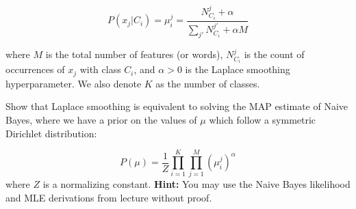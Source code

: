 \documentclass[lang=cn,11pt]{elegantbook}
\begin{document}
\begin{equation}
    P(x_j | C_i) = \mu_i^j = \frac{N_{C_i}^j + \alpha}{\sum_{j'} N_{C_i}^{j'} + \alpha M}
\end{equation}

where $M$ is the total number of features (or words), $N_{C_i}^j$ is the count of occurrences of $x_j$ with class $C_i$, and $\alpha > 0$ is the Laplace smoothing hyperparameter. We also denote $K$ as the number of classes.

Show that Laplace smoothing is equivalent to solving the MAP estimate of Naive Bayes, where we have a prior on the values of $\mu$ which follow a symmetric Dirichlet distribution:

\begin{equation}
    P(\mu) = \frac{1}{Z} \prod_{i=1}^{K} \prod_{j=1}^{M} (\mu_i^j)^\alpha
\end{equation}
where $Z$ is a normalizing constant.
\textbf{Hint:} You may use the Naive Bayes likelihood and MLE derivations from lecture without proof.
\end{document}
